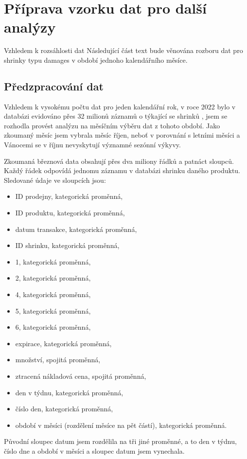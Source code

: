 \chapter{Příprava vzorku dat pro další analýzy}

Vzhledem k rozsáhlosti dat
Následující část text bude věnována rozboru dat pro shrinky typu damages v období jednoho kalendářního měsíce.

\section{Předzpracování dat}


Vzhledem k vysokému počtu dat pro jeden kalendářní rok, 
v roce 2022 bylo v databázi evidováno přes 32 milionů záznamů o týkající se shrinků
, jsem se rozhodla provést analýzu na měsíčním výběru dat z tohoto období. Jako zkoumaný měsíc jsem vybrala měsíc říjen, neboť v porovnání s letními měsíci a Vánocemi se v říjnu nevyskytují významné sezónní výkyvy.

Zkoumaná březnová data obsahují přes dva miliony řádků a patnáct sloupců. Každý řádek odpovídá jednomu záznamu v databázi shrinku daného produktu. Sledované údaje ve sloupcích jsou: 
\begin{itemize}
    \itemsep0em
    \item ID prodejny, kategorická proměnná,
    \item ID produktu, kategorická proměnná,
    \item datum transakce, kategorická proměnná,
    \item ID shrinku, kategorická proměnná,
    \item 1, kategorická proměnná,
    \item 2, kategorická proměnná,
    \item 4, kategorická proměnná,
    \item 5, kategorická proměnná,
    \item 6, kategorická proměnná,
    \item expirace, kategorická proměnná,
    \item množství, spojitá proměnná,
    \item ztracená nákladová cena, spojitá proměnná,
    \item den v týdnu, kategorická proměnná,
    \item číslo den, kategorická proměnná,
    \item období v měsíci (rozdělení měsíce na pět částí), kategorická proměnná.
\end{itemize}
Původní sloupec datum jsem rozdělila na tři jiné proměnné, a to den v týdnu, číslo dne a období v měsíci a sloupec datum jsem vynechala. 


